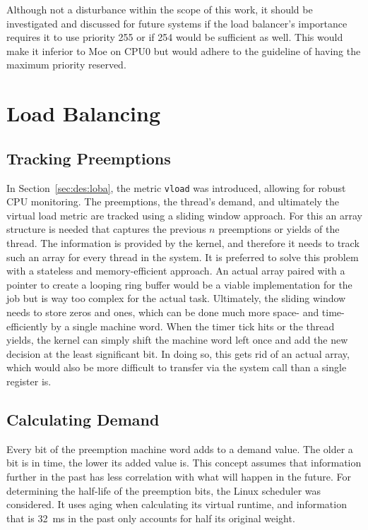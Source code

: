 Although not a disturbance within the scope of this work, it should be investigated and discussed for future systems if the load balancer's importance requires it to use priority 255 or if 254 would be sufficient as well.
This would make it inferior to Moe on CPU0 but would adhere to the guideline of having the maximum priority reserved.

\fi

\section{Load Balancing}
\label{sec:impl:loba}

\subsection{Tracking Preemptions}

In Section~\ref{sec:des:loba}, the metric \texttt{vload} was introduced, allowing for robust CPU monitoring.
The preemptions, the thread's demand, and ultimately the virtual load metric are tracked using a sliding window approach.
For this an array structure is needed that captures the previous $n$ preemptions or yields of the thread.	
The information is provided by the kernel, and therefore it needs to track such an array for every thread in the system.
It is preferred to solve this problem with a stateless and memory-efficient approach.
An actual array paired with a pointer to create a looping ring buffer would be a viable implementation for the job but is way too complex for the actual task.
Ultimately, the sliding window needs to store zeros and ones, which can be done much more space- and time-efficiently by a single machine word.
When the timer tick hits or the thread yields, the kernel can simply shift the machine word left once and add the new decision at the least significant bit.
In doing so, this gets rid of an actual array, which would also be more difficult to transfer via the system call than a single register is.

\subsection{Calculating Demand}

Every bit of the preemption machine word adds to a demand value.
The older a bit is in time, the lower its added value is.
This concept assumes that information further in the past has less correlation with what will happen in the future.
For determining the half-life of the preemption bits, the Linux scheduler was considered.
It uses aging when calculating its virtual runtime, and information that is \SI{32}{\ms} in the past only accounts for half its original weight.

